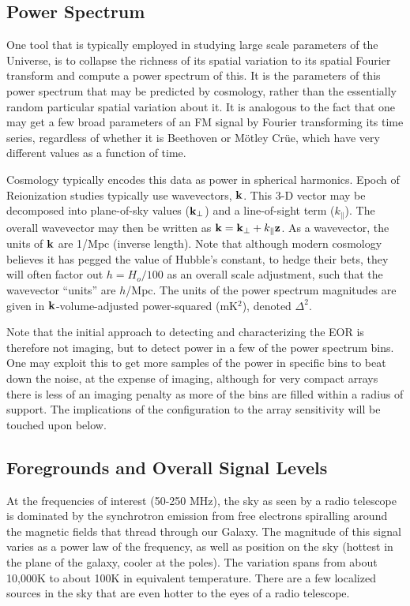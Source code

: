\documentclass[ars]{copernicus}
\def\kperp{k_{\bot}}
\def\kpar{k_{\|}}
\def\kperp{k_{\bot}}
\def\kpar{k_{\|}}
\def\k{{\bf k}}
\begin{document}
\subsection{Power Spectrum}
\label{sec:pspec}
One tool that is typically employed in studying large scale parameters of the
Universe, is to collapse the richness of its spatial variation to its spatial Fourier
transform and compute a power spectrum of this. It is the parameters of this power
spectrum that may be predicted by cosmology, rather than the essentially random
particular spatial variation about it. It is analogous to the fact that one may get a few broad
parameters of an FM signal by Fourier transforming its time series, regardless of whether it is
Beethoven or M\"{o}tley Cr\"{u}e, which have very different values as a function of time.

Cosmology typically encodes this data as power in spherical harmonics.  Epoch of
Reionization studies typically use wavevectors, $\k$.  This 3-D vector may be decomposed
into plane-of-sky values (${\bf \kperp}$) and a line-of-sight term (${\kpar}$).  The overall
wavevector may then be written as $\k = {\bf \kperp} + \kpar{\bf z}$.  As a wavevector,
the units of $\k$ are 1/Mpc (inverse length).  Note that although modern cosmology believes
it has pegged the value of Hubble's constant, to hedge their bets, they will often factor out
$h=H_o/100$ as an overall scale adjustment, such that the wavevector ``units'' are $h$/Mpc.  The units
of the power spectrum magnitudes are given in $\k$-volume-adjusted power-squared (mK$^2$), denoted
$\Delta ^2$.

Note that the initial approach to detecting and characterizing the EOR is therefore not imaging, but 
to detect power in a few of the power spectrum bins.  One 
may exploit this to get more samples of the power in specific bins to beat down the noise, at the expense of 
imaging, although for very compact arrays there is less of an imaging penalty as more of the bins
are filled within a radius of support.  The implications of the configuration to the array sensitivity
will be touched upon below.

\subsection{Foregrounds and Overall Signal Levels}
\label{sec:foregrounds}
At the frequencies of interest (50-250 MHz), the sky as seen by a radio telescope is dominated 
by the synchrotron emission from free electrons spiralling around the magnetic fields that thread
through our Galaxy.  The magnitude of this signal varies as a power law of the frequency, as well
as position on the sky (hottest in the plane of the galaxy, cooler at the poles).  The variation spans
from about 10,000K to about 100K in equivalent temperature.  There are a few localized sources
in the sky that are even hotter to the eyes of a radio telescope.
\end{document}

